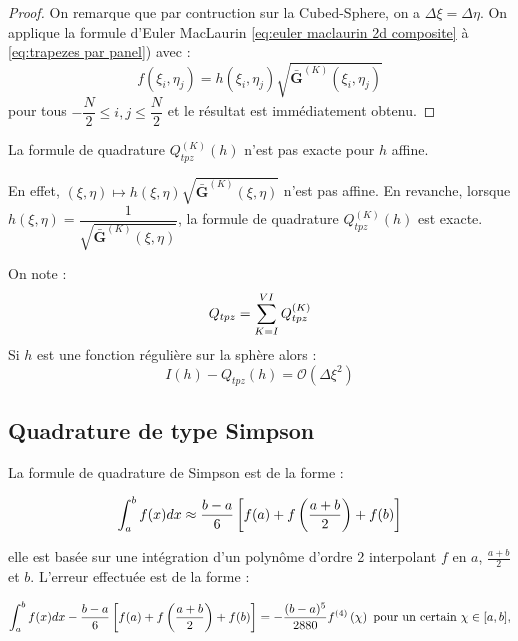 \begin{proof}
On remarque que par contruction sur la Cubed-Sphere, on a $\Delta \xi = \Delta \eta$.
On applique la formule d'Euler MacLaurin \eqref{eq:euler maclaurin 2d composite} à \eqref{eq:trapezes par panel}) avec :
\begin{equation}
f(\xi_i,\eta_j) = h(\xi_i, \eta_j) \sqrt{\mathbf{\bar{G}}^{(K)}(\xi_i, \eta_j)} 
\end{equation}
pour tous $-\dfrac{N}{2} \leq i,j \leq \dfrac{N}{2}$ et le résultat est immédiatement obtenu.
\end{proof}

\begin{remarque}
La formule de quadrature $Q_{tpz}^{(K)}(h)$ n'est pas exacte pour $h$ affine.

En effet, $(\xi,\eta) \mapsto h(\xi, \eta) \sqrt{\mathbf{\bar{G}}^{(K)}(\xi, \eta)}$ n'est pas affine.
En revanche, lorsque $h(\xi,\eta)=\dfrac{1}{\sqrt{\mathbf{\bar{G}}^{(K)}(\xi, \eta)}}$, la formule de quadrature $Q_{tpz}^{(K)}(h)$ est exacte.
\end{remarque}

\begin{proposition}
On note :
\begin{equation}
Q_{tpz}=\displaystyle\sum\limits_{K=I}^{VI} Q_{tpz}^{(K)}
\end{equation}
Si $h$ est une fonction régulière sur la sphère alors :
\begin{equation}
I(h) - Q_{tpz}(h) = \mathcal{O} \left( \Delta \xi^2 \right)
\end{equation}
\label{prop:consistance tpz}
\end{proposition}



\subsection{Quadrature de type Simpson}

La formule de quadrature de Simpson est de la forme :

\begin{equation}
\displaystyle\int_a^b f(x)dx \approx \dfrac{b-a}{6} \left[ f(a)+f\left(\dfrac{a+b}{2}\right) + f(b) \right]
\end{equation}

elle est basée sur une intégration d'un polynôme d'ordre 2 interpolant $f$ en $a$, $\frac{a+b}{2}$ et $b$.
L'erreur effectuée est de la forme :

\begin{equation}
\displaystyle\int_a^b f(x)dx - \dfrac{b-a}{6} \left[ f(a)+f\left(\dfrac{a+b}{2}\right) + f(b) \right] = - \dfrac{(b-a)^5}{2880}f^{(4)}\left( \chi \right) \text{ pour un certain } \chi \in [a,b],
\end{equation}

